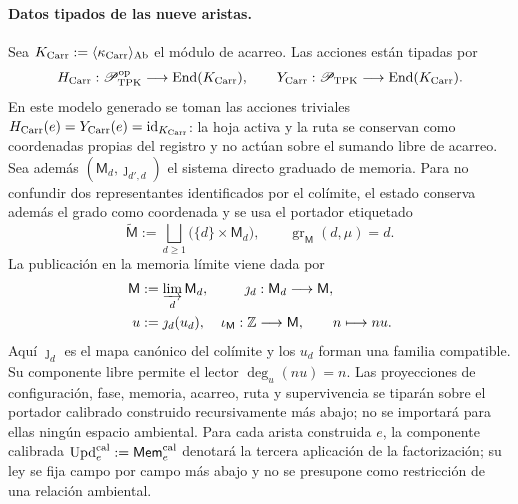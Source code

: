 \paragraph{Datos tipados de las nueve aristas.}
Sea
\(K_{\rm Carr}:=\langle\kappa_{\rm Carr}\rangle_{\rm Ab}\) el módulo de
acarreo. Las acciones están tipadas por
\[
 H_{\rm Carr}:\mathscr P_{\rm TPK}^{\rm op}
   \longrightarrow\operatorname{End}(K_{\rm Carr}),\qquad
 Y_{\rm Carr}:\mathscr P_{\rm TPK}
   \longrightarrow\operatorname{End}(K_{\rm Carr}).
\]
En este modelo generado se toman las acciones triviales
\(H_{\rm Carr}(e)=Y_{\rm Carr}(e)=\operatorname{id}_{K_{\rm Carr}}\): la
hoja activa y la ruta se conservan como coordenadas propias del registro y no
actúan sobre el sumando libre de acarreo. Sea además
\((\mathsf M_d,\jmath_{d',d})\) el sistema directo graduado de memoria. Para
no confundir dos representantes identificados por el colímite, el estado
conserva además el grado como coordenada y se usa el portador etiquetado
\[
 \widetilde{\mathsf M}:=
 \bigsqcup_{d\ge1}\bigl(\{d\}\times\mathsf M_d\bigr),
 \qquad
 \operatorname{gr}_{\mathsf M}(d,\mu)=d.
\]
La publicación en la memoria límite viene dada por
\[
\begin{aligned}
 \mathsf M&:=\varinjlim_d\mathsf M_d,&
 \jmath_d&:\mathsf M_d\longrightarrow\mathsf M,\\
 u&:=\jmath_d(u_d),&
 \iota_{\mathsf M}:\mathbb Z&\longrightarrow\mathsf M,
 \qquad n\longmapsto nu .
\end{aligned}
\]
Aquí \(\jmath_d\) es el mapa canónico del colímite y los \(u_d\) forman una
familia compatible. Su componente libre permite
el lector \(\deg_u(nu)=n\).
Las proyecciones de configuración, fase, memoria, acarreo, ruta y
supervivencia se tiparán sobre el portador calibrado construido
recursivamente más abajo; no se importará para ellas ningún espacio ambiental.
Para cada arista construida \(e\), la
componente calibrada
\(\operatorname{Upd}^{\rm cal}_e:=\mathsf{Mem}^{\rm cal}_e\) denotará la
tercera aplicación de la factorización; su ley se fija campo por campo más
abajo y no se presupone como restricción de una relación ambiental.

